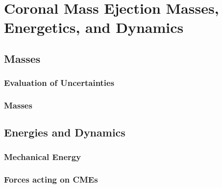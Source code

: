 

\chapter{Coronal Mass Ejection Masses, Energetics, and Dynamics} 
\label{chap:4}


\section{Masses}\label{sec:4}

\subsection{Evaluation of Uncertainties}\label{sec:40}

\subsection{Masses}\label{sec:41}

\section{Energies and Dynamics}\label{sec:4}

\subsection{Mechanical Energy}\label{sec:42}

\subsection{Forces acting on CMEs}\label{sec:43}


